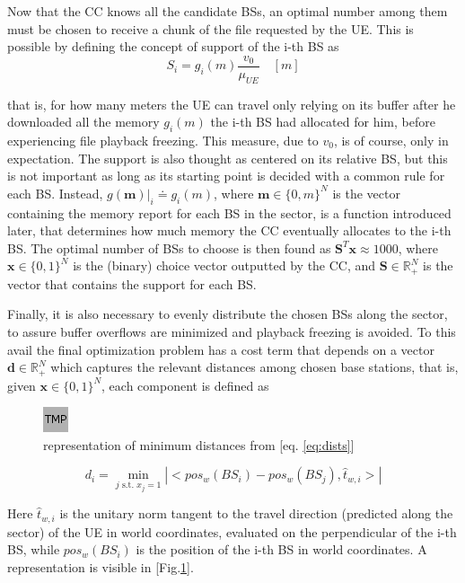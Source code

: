 \documentclass[conference,10pt]{IEEEtran}
\begin{document}
Now that the CC knows all the candidate BSs, an optimal number among them must be chosen to receive a chunk of the file requested by the UE. This is possible by defining the concept of support of the i-th BS as
\begin{equation}
\label{eq:support-region}
S_i = g_i(m)\frac{v_0}{\mu_{U\!E}} \quad [m]
\end{equation}

that is, for how many meters the UE can travel only relying on its buffer after he downloaded all the memory $g_i(m)$ the i-th BS had allocated for him, before experiencing file playback freezing. This measure, due to $v_0$, is of course, only in expectation. The support is also thought as centered on its relative BS, but this is not important as long as its starting point is decided with a common rule for each BS. Instead, $g(\mathbf{m})|_i \doteq g_i(m)$, where $\mathbf{m} \in \{0, m\}^N$ is the vector containing the memory report for each BS in the sector, is a function introduced later, that determines how much memory the CC eventually allocates to the i-th BS. The optimal number of BSs to choose is then found as $\mathbf{S}^T\mathbf{x} \approx 1000$, where $\mathbf{x} \in \{0,1\}^N$ is the (binary) choice vector outputted by the CC, and  $\mathbf{S} \in \mathbb{R}_+^N$ is the vector that contains the support for each BS.

Finally, it is also necessary to evenly distribute the chosen BSs along the sector, to assure buffer overflows are minimized and playback freezing is avoided. To this avail the final optimization problem has a cost term that depends on a vector $\mathbf{d} \in \mathbb{R}_+^N$ which captures the relevant distances among chosen base stations, that is, given $\mathbf{x} \in \{0,1\}^N$, each component is defined as

\begin{figure}[t]
	\centering
	\includegraphics{placeholder.png}
	\caption{representation of minimum distances from [eq. \ref{eq:dists}] }
	\label{fig:min_dists}
\end{figure}

\begin{equation}
\label{eq:dists}
d_i = \min_{j \textrm{ s.t. }x_j = 1} |<pos_w(BS_i) - pos_w(BS_j), \hat{t}_{w, i}>|
\end{equation} 

Here $\hat{t}_{w, i}$ is the unitary norm tangent to the travel direction (predicted along the sector) of the UE in world coordinates, evaluated on the perpendicular of the i-th BS, while $pos_w(BS_i)$ is the position of the i-th BS in world coordinates. A representation is visible in [Fig.\ref{fig:min_dists}].
\end{document}
